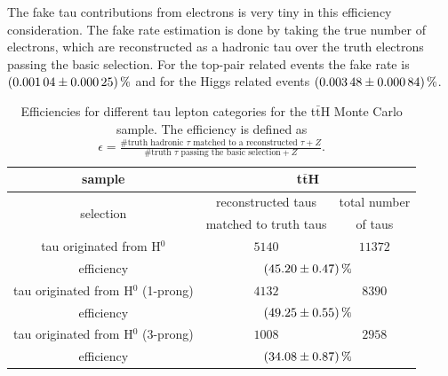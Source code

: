 %
The fake tau contributions from electrons is very tiny in this efficiency consideration. The fake rate estimation is done by taking the true number of electrons, which are reconstructed as a hadronic tau over the truth electrons passing the basic selection. For the top-pair related events the fake rate is $\SI{0.00104\pm 0.00025}{\percent}$ and for the Higgs related events $\SI{0.00348\pm 0.00084}{\percent}$.\par
%
%
%
%
%
%	
\begin{table}[htbp]
		\centering
                \footnotesize
                \renewcommand{\arraystretch}{1.2}
		\begin{tabular*}{\linewidth}{@{\extracolsep{\fill}}ccc}
		\hline
                \hline
		\textbf{sample}    & \multicolumn{2}{c}{\textbf{t$\bar{\textbf{t}}$H}} 
		\\
		\hline
		\multirow{2}{*}{selection}   & reconstructed taus       & total number
                \\
                & matched to truth taus & of taus
		\\ 
		\hline
                tau originated from H$^0$        & $5140$          & $11372$
		\\
		efficiency                     & \multicolumn{2}{c}{$\SI{45.20\pm 0.47}{\percent}$}
		\\
		\hline
                tau originated from H$^0$ (1-prong)         & $4132$          & $8390$
		\\
		efficiency                     & \multicolumn{2}{c}{$\SI{49.25\pm 0.55}{\percent}$}
		\\
		\hline
                tau originated from H$^0$ (3-prong)         & $1008$          & $2958$
		\\
		efficiency                    & \multicolumn{2}{c}{$\SI{34.08\pm 0.87}{\percent}$}
		\\
		\hline
		\hline
		\end{tabular*}
		\caption[Efficiencies for the t$\bar{\text{t}}$H sample.]{Efficiencies for different tau lepton categories for the t$\bar{\text{t}}$H Monte Carlo sample. The efficiency is defined as $\epsilon=\frac{\text{\#truth hadronic }\tau\text{ matched to a reconstructed }\tau+Z}{\text{\#truth }\tau\text{ passing the basic selection}+Z}$.}
		\label{ttbarttHEffTable}
          \renewcommand{\arraystretch}{1}
\end{table}
